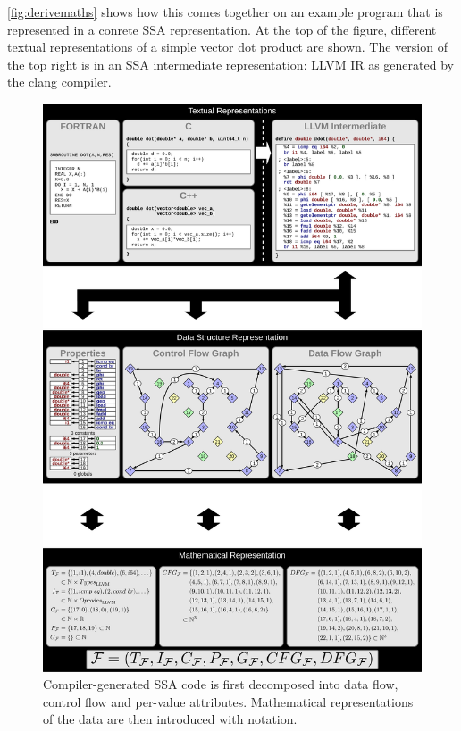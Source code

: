     \autoref{fig:derivemaths} shows how this comes together on an example
    program that is represented in a conrete SSA representation.
    At the top of the figure, different textual representations of a simple
    vector dot product are shown.
    The version of the top right is in an SSA intermediate representation: LLVM
    IR as generated by the clang compiler.

\begin{figure}[p]
\centering
\includegraphics[width=\textwidth,height=1.5\textwidth]{figures/ssamathmodel.pdf}
\vspace{9.31595pt}
\caption{Compiler-generated SSA code is first decomposed into data flow, control
         flow and per-value attributes.
         Mathematical representations of the data are then introduced with
         notation.}
\label{fig:derivemaths}
\end{figure}

